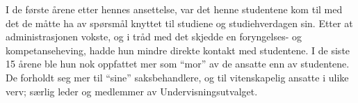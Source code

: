 I de første årene etter hennes ansettelse, var det henne studentene kom til med det de måtte ha av spørsmål knyttet til studiene og studiehverdagen sin. Etter at administrasjonen vokste, og i tråd med det skjedde en foryngelses- og kompetanseheving, hadde hun mindre direkte kontakt med studentene. I de siste 15 årene ble hun nok oppfattet mer som ``mor'' av de ansatte enn av studentene. De forholdt seg mer til ``sine'' saksbehandlere, og til vitenskapelig ansatte i ulike verv; særlig leder og medlemmer av Undervisningsutvalget.
